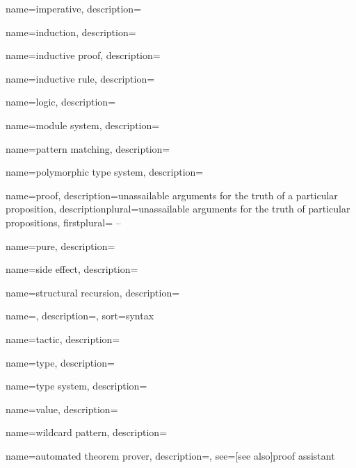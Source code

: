 {
  name={imperative},
  description={}
}

{
  name={induction},
  description={}
}

{
  name={inductive proof},
  description={}
}

{
  name={inductive rule},
  description={}
}

{
  name={logic},
  description={}
}

{
  name={module system},
  description={}
}

{
  name={pattern matching},
  description={}
}

{
  name={polymorphic type system},
  description={}
}

{
  name={proof},
  description={unassailable arguments for the truth of a particular
  proposition},
  descriptionplural={unassailable arguments for the truth of particular
  propositions},
  firstplural={ -- }
}

{
  name={pure},
  description={}
}

{
  name={side effect},
  description={}
}

{
  name={structural recursion},
  description={}
}

{
  name=,
  description={},
  sort={syntax}
}

{
  name={tactic},
  description={}
}

{
  name={type},
  description={}
}

{
  name={type system},
  description={}
}

{
  name={value},
  description={}
}

{
  name={wildcard pattern},
  description={}
}





{
  name={automated theorem prover},
  description={},
  see=[see also]{proof assistant}
}
